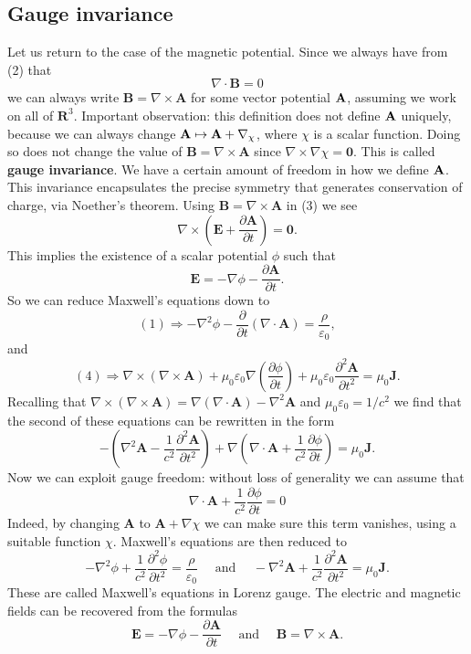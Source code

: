 \subsection{Gauge invariance}
Let us return to the case of the magnetic potential. Since we always have from (2) that
$$
    \nabla \cdot \mathbf{B}=0
$$
we can always write $\mathbf{B}=\nabla \times \mathbf{A}$ for some vector potential ${\bf A}$, assuming we work on all of $\mathbf{R}^{3}$. Important observation: this definition does not define ${\bf A}$ uniquely, because we can always change $ {\bf A} \mapsto {\bf A} + \nabla_\chi $, where $\chi$ is a scalar function. Doing so does not change the value of $\mathbf{B}=\nabla \times \mathbf{A}$ since $\nabla \times \nabla \chi=\mathbf{0}$. This is called \textbf{gauge invariance}. We have a certain amount of freedom in how we define ${\bf A}$. This invariance encapsulates the precise symmetry that generates conservation of charge, via Noether's theorem. Using $\mathbf{B}=\nabla \times \mathbf{A}$ in (3) we see
$$
    \nabla \times\left(\mathbf{E}+\frac{\partial \mathbf{A}}{\partial t}\right)=\mathbf{0}.
$$
This implies the existence of a scalar potential $\phi$ such that
$$
    \mathbf{E}=-\nabla \phi-\frac{\partial \mathbf{A}}{\partial t}.
$$
So we can reduce Maxwell's equations down to
$$
    (1) \Longrightarrow -\nabla^{2} \phi-\frac{\partial}{\partial t}(\nabla \cdot \mathbf{A})=\frac{\rho}{\varepsilon_{0}},
$$
and
$$
    (4) \Longrightarrow \nabla \times(\nabla \times \mathbf{A})+\mu_{0} \varepsilon_{0} \nabla\left(\frac{\partial \phi}{\partial t}\right)+\mu_{0} \varepsilon_{0} \frac{\partial^{2} \mathbf{A}}{\partial t^{2}}=\mu_{0} \mathbf{J}.
$$
Recalling that $\nabla \times(\nabla \times \mathbf{A})=\nabla(\nabla \cdot \mathbf{A})-\nabla^{2} \mathbf{A}$ and $\mu_{0} \varepsilon_{0}=1 / c^{2}$ we find that the second
of these equations can be rewritten in the form
$$
    -\left(\nabla^{2} \mathbf{A}-\frac{1}{c^{2}} \frac{\partial^{2} \mathbf{A}}{\partial t^{2}}\right)+\nabla\left(\nabla \cdot \mathbf{A}+\frac{1}{c^{2}} \frac{\partial \phi}{\partial t}\right)=\mu_{0} \mathbf{J}.
$$
Now we can exploit gauge freedom: without loss of generality we can assume that
\[
    \nabla \cdot \mathbf{A}+\frac{1}{c^{2}} \frac{\partial \phi}{\partial t}=0
\]
Indeed, by changing $\mathbf{A}$ to $\mathbf{A}+\nabla \chi$ we can make sure this term vanishes, using a suitable function $\chi$. Maxwell's equations are then reduced to
\[
    -\nabla^{2} \phi+\frac{1}{c^{2}} \frac{\partial^{2} \phi}{\partial t^{2}}=\frac{\rho}{\varepsilon_{0}} \quad \text { and } \quad-\nabla^{2} \mathbf{A}+\frac{1}{c^{2}} \frac{\partial^{2} \mathbf{A}}{\partial t^{2}}=\mu_{0} \mathbf{J}.
\]
These are called Maxwell's equations in Lorenz gauge. The electric and magnetic fields can be recovered from the formulas
\[
    \mathbf{E}=-\nabla \phi-\frac{\partial \mathbf{A}}{\partial t} \quad \text { and } \quad \mathbf{B}=\nabla \times \mathbf{A}.
\]